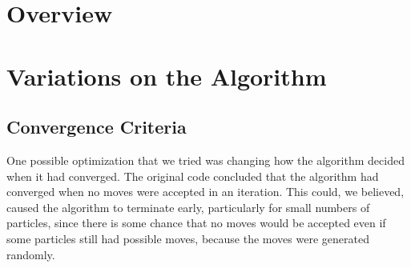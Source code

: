 \documentclass[twocolumn,10pt]{article}
\begin{document}

\section*{Overview}


\section*{Variations on the Algorithm}

\subsection*{Convergence Criteria}

One possible optimization that we tried was changing how the algorithm decided
when it had converged. The original code concluded that the algorithm had
converged when no moves were accepted in an iteration. This could, we
believed, caused the algorithm to terminate early, particularly for small
numbers of particles, since there is some chance that no moves would be
accepted even if some particles still had possible moves, because the moves
were generated randomly.


\subsection*{}


\subsection*{}
\end{document}
